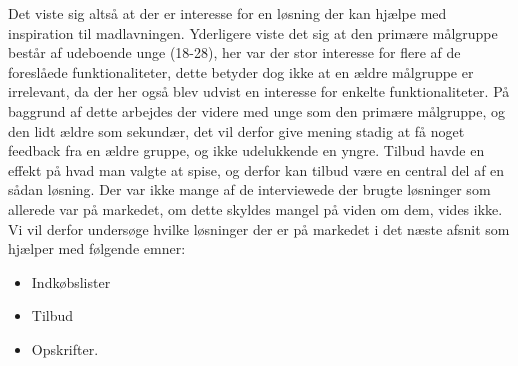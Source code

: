 Det viste sig altså at der er interesse for en løsning der kan hjælpe med inspiration til madlavningen. 
Yderligere viste det sig at den primære målgruppe består af udeboende unge (18-28), her var der stor interesse for flere af de foreslåede funktionaliteter, dette betyder dog ikke at en ældre målgruppe er irrelevant, da der her også blev udvist en interesse for enkelte funktionaliteter.
På baggrund af dette arbejdes der videre med unge som den primære målgruppe, og den lidt ældre som sekundær, det vil derfor give mening stadig at få noget feedback fra en ældre gruppe, og ikke udelukkende en yngre.
Tilbud havde en effekt på hvad man valgte at spise, og derfor kan tilbud være en central del af en sådan løsning.
Der var ikke mange af de interviewede der brugte løsninger som allerede var på markedet, om dette skyldes mangel på viden om dem, vides ikke.
Vi vil derfor undersøge hvilke løsninger der er på markedet i det næste afsnit som hjælper med følgende emner:


\begin{itemize}
	\item Indkøbslister
	\item Tilbud
	\item Opskrifter.
\end{itemize}
